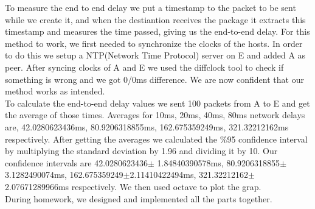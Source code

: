 \documentclass[12pt]{article}
\begin{document}
To measure the end to end delay we put a timestamp to the packet to be sent while we create it, and when the destiantion receives the package it extracts this timestamp and measures the time passed, giving us the end-to-end delay. For this method to work, we first needed to synchronize the clocks of the hosts. In order to do this we setup a NTP(Network Time Protocol) server on E and added A as peer. After syncing clocks of A and E we used the diffclock tool to check if something is wrong and we got 0/0ms difference. We are now confident that our method works as intended.\\

To calculate the end-to-end delay values we sent 100 packets from A to E and get the average of those times. Averages for 10ms, 20ms, 40ms, 80ms network delays are, 42.0280623436ms, 80.9206318855ms, 162.675359249ms, 321.32212162ms respectively. After getting the averages we calculated the \%95 confidence interval by multiplying the standard deviation by 1.96 and dividing it by 10. Our confidence intervals are 42.0280623436$\pm$ 1.84840390578ms, 80.9206318855$\pm$3.1282490074ms, 162.675359249$\pm$2.11410422494ms, 321.32212162$\pm$2.07671289966ms respectively. We then used octave to plot the grap.\\

During homework, we designed and implemented all the parts together.
\end{document}
